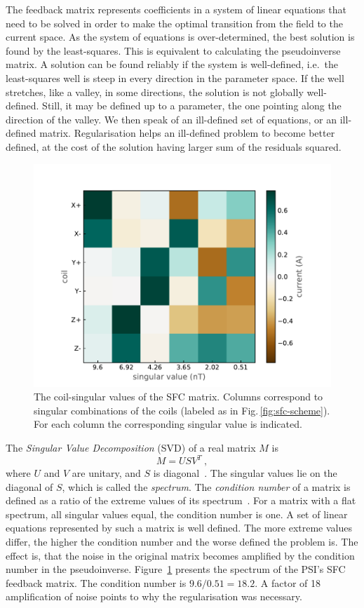 The feedback matrix represents coefficients in a system of linear equations that need to be solved in order to make the optimal transition from the field to the current space.
As the system of equations is over-determined, the best solution is found by the least-squares.
This is equivalent to calculating the pseudoinverse matrix. A solution can be found reliably if the system is well-defined, i.e.\ the least-squares well is steep in every direction in the parameter space.
If the well stretches, like a valley, in some directions, the solution is not globally well-defined.
Still, it may be defined up to a parameter, the one pointing along the direction of the valley.
We then speak of an ill-defined set of equations, or an ill-defined matrix.
Regularisation helps an ill-defined problem to become better defined, at the cost of the solution having larger sum of the residuals squared.

\begin{figure}
  \centering
  \includegraphics[width=.8\linewidth]{gfx/nEDM_SFC/coil-singular_vectors_of_the_nEDM_SFC_matrix.pdf}
  \caption{The coil-singular values of the SFC matrix.
  Columns correspond to singular combinations of the coils (labeled as in Fig.\,\ref{fig:sfc-scheme}).
  For each column the corresponding singular value is indicated.}\label{fig:nEDM_SFC_svd}
\end{figure}

The \emph{Singular Value Decomposition} (SVD) of a real matrix $M$ is
\begin{equation}
  M = U S V^T \ , 
\end{equation}
where $U$ and $V$ are unitary, and $S$ is diagonal~\cite{Golub1965}.
The singular values lie on the diagonal of $S$, which is called the \emph{spectrum}.
The \emph{condition number} of a matrix is defined as a ratio of the extreme values of its spectrum~\cite{Regression}.
For a matrix with a flat spectrum, all singular values equal, the condition number is one.
A set of linear equations represented by such a matrix is well defined.
The more extreme values differ, the higher the condition number and the worse defined the problem is.
The effect is, that the noise in the original matrix becomes amplified by the condition number in the pseudoinverse. Figure~\ref{fig:nEDM_SFC_svd} presents the spectrum of the PSI's SFC feedback matrix.
The condition number is $9.6 / 0.51 = 18.2$.
A factor of 18 amplification of noise points to why the regularisation was necessary.

